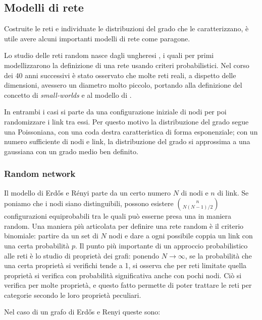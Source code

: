 \subsection{Modelli di rete}
Costruite le reti e individuate le distribuzioni del grado che le caratterizzano, è utile avere alcuni importanti modelli di rete come paragone.

Lo studio delle reti random nasce dagli ungheresi \textcite{Erdos1959}, i quali per primi modellizzarono la definizione di una rete usando criteri probabilistici. Nel corso dei 40 anni successivi è stato osservato che molte reti reali, a dispetto delle dimensioni, avessero un diametro molto piccolo, portando alla definizione del concetto di \emph{small-worlds} e al modello di \textcite{Watts1998}.

In entrambi i casi si parte da una configurazione iniziale di nodi per poi randomizzare i link tra essi. Per questo motivo la distribuzione del grado segue una Poissoniana, con una coda destra caratteristica di forma esponenziale; con un numero sufficiente di nodi e link, la distribuzione del grado si approssima a una gaussiana con un grado medio ben definito.

\subsubsection{Random network}
Il modello di Erdős e Rényi parte da un certo numero $N$ di nodi e $n$ di link. Se poniamo che i nodi siano distinguibili, possono esistere $\binom{n}{N(N-1)/2}$ 
configurazioni equiprobabili tra le quali può esserne presa una in maniera random. Una maniera più articolata per definire una rete random è il criterio binomiale: partire da un set di $N$ nodi e dare a ogni possibile coppia un link con una certa probabilità  $p$. 
Il punto più importante di un approccio probabilistico alle reti è lo studio di proprietà dei grafi: ponendo $N \rightarrow \infty$, se la probabilità che una certa proprietà si verifichi tende a 1, si osserva che per reti limitate quella proprietà si verifica con probabilità significativa anche con pochi nodi. Ciò si verifica per molte proprietà, e questo fatto permette di poter trattare le reti per categorie secondo le loro proprietà peculiari.

Nel caso di un grafo di Erdős e Renyi queste sono:

